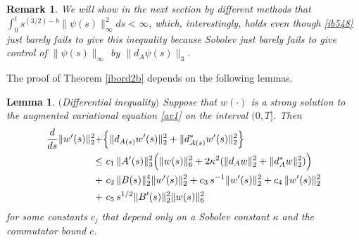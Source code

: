 \documentclass[12pt]{article}
\newtheorem{lemma}[theorem]{Lemma}
\newtheorem{remark}[theorem]{Remark}
\def \eref{\eqref}
\numberwithin{equation}{section}
\begin{document}
\begin{remark}{\rm We will show in the next section by different methods that
$\int_0^t s^{(3/2) - b}  \| \psi(s)\|_\infty^2 ds < \infty$, which, interestingly, holds even though
 \eref{ib548} just
 barely fails to give this inequality because Sobolev just barely fails to give control
  of $\|\psi(s)\|_\infty$ by $\| d_A\psi(s)\|_3$.
}
\end{remark}

The proof of Theorem \ref{ibord2b} depends on the following lemmas. 


             \begin{lemma}\label{diffinb} $($Differential inequality$)$
             Suppose that $w(\cdot)$ is a strong solution to the
augmented variational equation \eref{av1} on the interval $(0,T]$.
Then   
\begin{align}
\frac{d}{ds} \| w'(s) \|_2^2 
+&\Big\{ \|d_{A(s)} w'(s) \|_2^2  + \|d_{A(s)}^* w'(s) \|_2^2  \Big\}   \notag\\
\le  &\ c_1\, \|A'(s)\|_3^2 \Big(\|w(s)\|_6^2 
                               + 2\kappa^2  ( \|d_Aw\|_2^2 + \|d_A^* w\|_2^2 ) \Big) \notag\\
+&\ c_2\, \| B(s)\|_2^4 \|w'(s)\|_2^2 + c_3\, s^{-1} \|w'(s)\|_2^2  + c_4\, \|w'(s)\|_2^2 \notag\\
+ &\ c_5\,  s^{1/2} \|B'(s)\|_2^2 \| w(s)\|_6^2     \label{ib550b}
\end{align}
for some constants $c_j$ that depend only on a Sobolev constant $\kappa$ and
 the commutator bound $c$.
\end{lemma}
\end{document}
